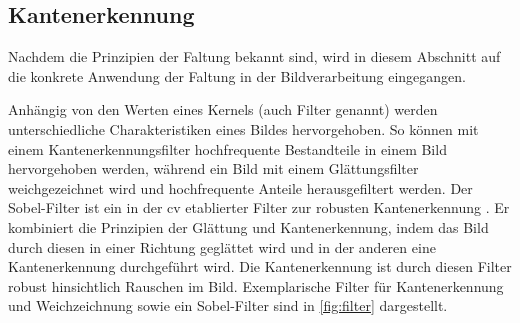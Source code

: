 \subsection{Kantenerkennung}
\label{sec:kantenerkennung}

Nachdem die Prinzipien der Faltung bekannt sind, wird in diesem Abschnitt auf die konkrete Anwendung der Faltung in der Bildverarbeitung eingegangen.

Anhängig von den Werten eines Kernels (auch Filter genannt) werden unterschiedliche Charakteristiken eines Bildes hervorgehoben. So können mit einem Kantenerkennungsfilter hochfrequente Bestandteile in einem Bild hervorgehoben werden, während ein Bild mit einem Glättungsfilter weichgezeichnet wird und hochfrequente Anteile herausgefiltert werden. Der Sobel-Filter ist ein in der \ac{cv} etablierter Filter zur robusten Kantenerkennung \cite{sobel,cv_general}. Er kombiniert die Prinzipien der Glättung und Kantenerkennung, indem das Bild durch diesen in einer Richtung geglättet wird und in der anderen eine Kantenerkennung durchgeführt wird. Die Kantenerkennung ist durch diesen Filter robust hinsichtlich Rauschen im Bild. Exemplarische Filter für Kantenerkennung und Weichzeichnung sowie ein Sobel-Filter sind in \autoref{fig:filter} dargestellt.

